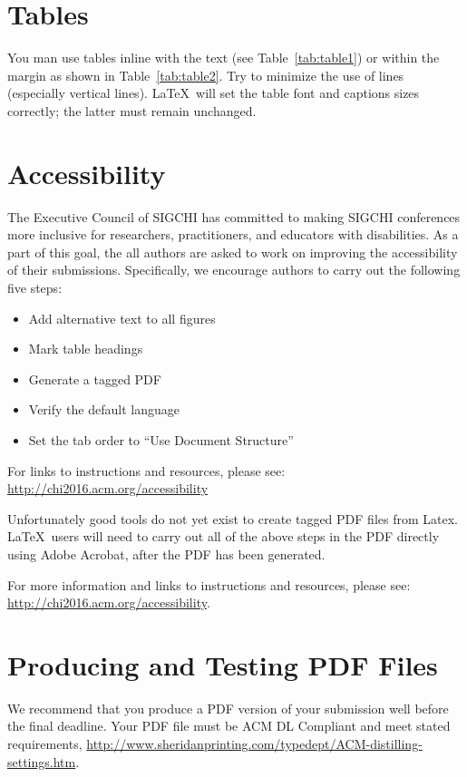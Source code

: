 \documentclass{sigchi-ext}
\begin{document}
\section{Tables}
You man use tables inline with the text (see Table~\ref{tab:table1})
or within the margin as shown in Table~\ref{tab:table2}. Try to
minimize the use of lines (especially vertical lines). \LaTeX\ will
set the table font and captions sizes correctly; the latter must
remain unchanged.

\section{Accessibility}
The Executive Council of SIGCHI has committed to making SIGCHI
conferences more inclusive for researchers, practitioners, and
educators with disabilities. As a part of this goal, the all authors
are asked to work on improving the accessibility of their
submissions. Specifically, we encourage authors to carry out the
following five steps:
\begin{itemize}\compresslist%
\item Add alternative text to all figures
\item Mark table headings
\item Generate a tagged PDF
\item Verify the default language
\item Set the tab order to ``Use Document Structure''
\end{itemize}

For links to instructions and resources, please see:
\url{http://chi2016.acm.org/accessibility}

Unfortunately good tools do not yet exist to create tagged PDF files
from Latex. \LaTeX\ users will need to carry out all of the above
steps in the PDF directly using Adobe Acrobat, after the PDF has been
generated.

For more information and links to instructions and resources, please
see:
\url{http://chi2016.acm.org/accessibility}.

\section{Producing and Testing PDF Files}
We recommend that you produce a PDF version of your submission well
before the final deadline. Your PDF file must be ACM DL Compliant and
meet stated requirements,
\url{http://www.sheridanprinting.com/typedept/ACM-distilling-settings.htm}.
\end{document}
